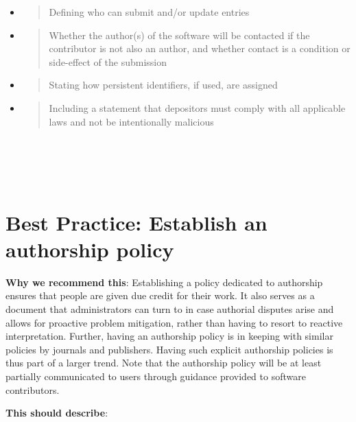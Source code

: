 \documentclass[]{article}
\begin{document}
\begin{itemize}
\item
  \begin{quote}
  Defining who can submit and/or update entries
  \end{quote}
\item
  \begin{quote}
  Whether the author(s) of the software will be contacted if the
  contributor is not also an author, and whether contact is a condition
  or side-effect of the submission
  \end{quote}
\item
  \begin{quote}
  Stating how persistent identifiers, if used, are assigned
  \end{quote}
\item
  \begin{quote}
  Including a statement that depositors must comply with all applicable
  laws and not be intentionally malicious
  \end{quote}
\end{itemize}

\section{\texorpdfstring{\\
}{ }}\label{section-5}

\newpage
\section{Best Practice: Establish an authorship
policy}\label{best-practice-establish-an-authorship-policy}

\textbf{Why we recommend this}: Establishing a policy dedicated to
authorship ensures that people are given due credit for their work. It
also serves as a document that administrators can turn to in case
authorial disputes arise and allows for proactive problem mitigation,
rather than having to resort to reactive interpretation. Further, having
an authorship policy is in keeping with similar policies by journals and
publishers. Having such explicit authorship policies is thus part of a
larger trend. Note that the authorship policy will be at least partially
communicated to users through guidance provided to software
contributors.

\textbf{This should describe}:
\end{document}
